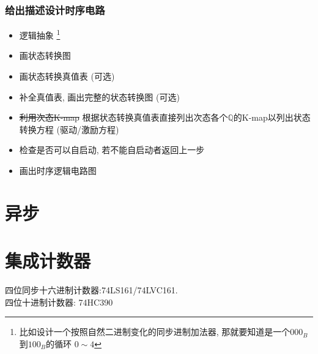 \documentclass[scheme=chinese,a4paper]{report}
\begin{document}
\subsubsection{给出描述设计时序电路}
\begin{itemize}
    \item 逻辑抽象 \footnote{比如设计一个按照自然二进制变化的同步进制加法器, 那就要知道是一个$000_B$到$100_B$的循环 $0\sim 4$}
    \item 画状态转换图
    \item 画状态转换真值表 (可选)
    \item 补全真值表, 画出完整的状态转换图 (可选)
    \item \sout{利用次态K-map} 根据状态转换真值表直接列出次态各个$\mathbb{Q}$的K-map以列出状态转换方程 (驱动/激励方程)
    \item 检查是否可以自启动, 若不能自启动者返回上一步
    \item 画出时序逻辑电路图
\end{itemize}

\section{异步}


\section{集成计数器}
四位同步十六进制计数器:74LS161/74LVC161. \\
四位十进制计数器: 74HC390
\end{document}
